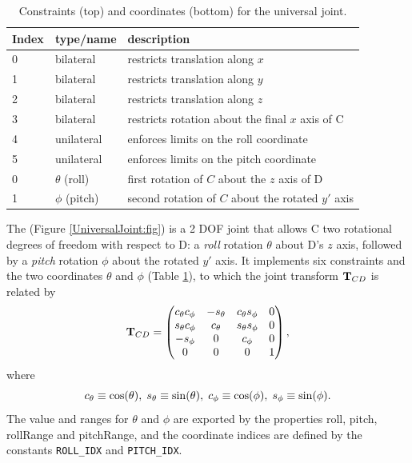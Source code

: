 \begin{table}[h]
\centering
\begin{tabular}{|l|l|l|}
\hline
Index & type/name & description \\
\hline
0 & bilateral & restricts translation along $x$ \\
1 & bilateral & restricts translation along $y$ \\
2 & bilateral & restricts translation along $z$ \\
3 & bilateral & restricts rotation about the final $x$ axis of C \\
4 & unilateral & enforces limits on the roll coordinate \\
5 & unilateral & enforces limits on the pitch coordinate \\
\hline
\hline
0 & $\theta$ (roll) & first rotation of $C$ about the $z$ axis of D \\
1 & $\phi$ (pitch) & second rotation of $C$ about the rotated $y'$ axis \\
\hline
\end{tabular}
\caption{Constraints (top) and coordinates (bottom) for the universal joint.}
\label{UniversalConstraints:tbl}
\end{table}

The  
(Figure \ref{UniversalJoint:fig}) is a 2 DOF joint
that allows C two rotational degrees of freedom with respect to D: a
{\it roll} rotation $\theta$ about D's $z$ axis, followed by a {\it
pitch} rotation $\phi$ about the rotated $y'$ axis. It implements six
constraints and the two coordinates $\theta$ and $\phi$
(Table \ref{UniversalConstraints:tbl}), to which the joint transform
${\bf T}_{CD}$ is related by
%
\begin{equation*}
{\bf T}_{CD} = \left(\begin{matrix}
c_\theta c_\phi & -s_\theta & c_\theta s_\phi & 0 \\
s_\theta c_\phi & c_\theta & s_\theta s_\phi & 0 \\
-s_\phi & 0 & c_\phi & 0 \\
0 & 0 & 0 & 1 
\end{matrix}\right),
\end{equation*}
where 
%
\begin{equation*}
c_\theta \equiv \cos(\theta),\; 
s_\theta \equiv \sin(\theta),\;
c_\phi \equiv \cos(\phi),\;
s_\phi \equiv \sin(\phi).
\end{equation*}
%
The value and ranges for $\theta$ and $\phi$ are exported by the
properties {\sf roll}, {\sf pitch}, {\sf rollRange} and {\sf
pitchRange}, and the coordinate indices are defined by the constants
{\tt ROLL\_IDX} and {\tt PITCH\_IDX}.  

